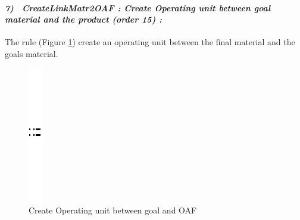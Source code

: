 \paragraph{\emph{7)~ CreateLinkMatr2OAF : Create Operating unit between goal material and the product (order 15) :} }
 
 
The rule (Figure \ref{fig:Create Operating unit between goal and OAF}) 
create an operating unit between the final material and the goals material.
 
\vspace{1cm}
\begin{figure}[th]
\centering 
	\quad{}
		\includegraphics{ch3/img/sep}
	\quad{}
\caption{\label{fig:Create Operating unit between goal and OAF}Create Operating unit between goal and OAF}
 
\end{figure}
\vspace{1cm}



